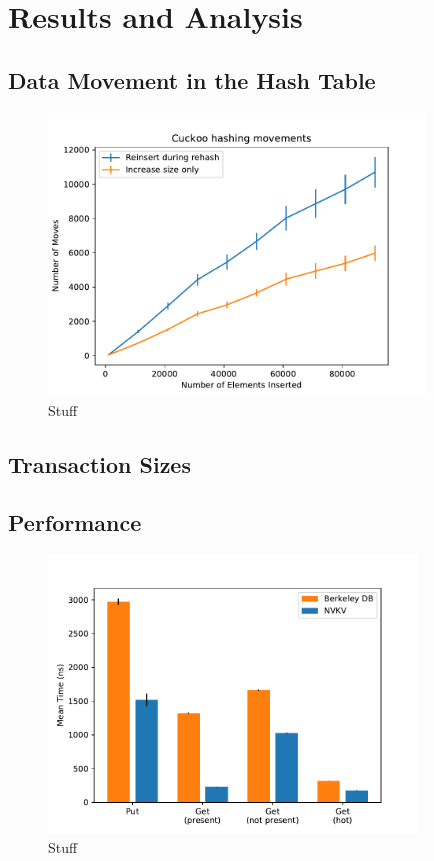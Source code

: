 \section{Results and Analysis}


\subsection{Data Movement in the Hash Table}

\begin{figure}
\centering
\includegraphics[width=100mm]{fig/moves}
\caption{Stuff}
\label{fig:moves}
\end{figure}

\subsection{Transaction Sizes}

\subsection{Performance}

\begin{figure}
\centering
\hspace*{-0.5in}
\includegraphics[width=98mm]{fig/perf}
\caption{Stuff}
\label{fig:perf}
\end{figure}

